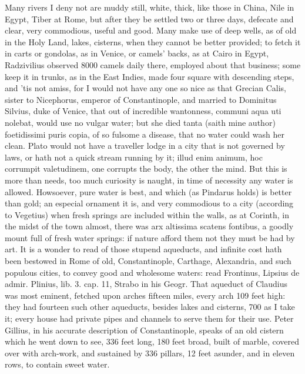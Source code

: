 {Many rivers I deny not are muddy still, white, thick, like those in
China, Nile in Egypt, Tiber at Rome, but after they be settled two or
three days, defecate and clear, very commodious, useful and good. Many
make use of deep wells, as of old in the Holy Land, lakes, cisterns,
when they cannot be better provided; to fetch it in carts or gondolas,
as in Venice, or camels' backs, as at Cairo in Egypt, Radzivilius
observed 8000 camels daily there, employed about that business; some
keep it in trunks, as in the East Indies, made four square with
descending steps, and 'tis not amiss, for I would not have any one so
nice as that Grecian Calis, sister to Nicephorus, emperor of
Constantinople, and married to Dominitus Silvius, duke of Venice,
that out of incredible wantonness, communi aqua uti nolebat, would use
no vulgar water; but she died tanta (saith mine author) foetidissimi
puris copia, of so fulsome a disease, that no water could wash her
clean. Plato would not have a traveller lodge in a city that is
not governed by laws, or hath not a quick stream running by it; illud
enim animum, hoc corrumpit valetudinem, one corrupts the body, the
other the mind. But this is more than needs, too much curiosity is
naught, in time of necessity any water is allowed. Howsoever, pure
water is best, and which (as Pindarus holds) is better than gold; an
especial ornament it is, and very commodious to a city (according to
Vegetius) when fresh springs are included within the walls, as at
Corinth, in the midst of the town almost, there was arx altissima
scatens fontibus, a goodly mount full of fresh water springs: if nature
afford them not they must be had by art. It is a wonder to read of
those stupend aqueducts, and infinite cost hath been bestowed in
Rome of old, Constantinople, Carthage, Alexandria, and such populous
cities, to convey good and wholesome waters: read Frontinus,
Lipsius de admir. Plinius, lib. 3. cap. 11, Strabo in his Geogr.
That aqueduct of Claudius was most eminent, fetched upon arches fifteen
miles, every arch 109 feet high: they had fourteen such other
aqueducts, besides lakes and cisterns, 700 as I take it; every
house had private pipes and channels to serve them for their use. Peter
Gillius, in his accurate description of Constantinople, speaks of an
old cistern which he went down to see, 336 feet long, 180 feet broad,
built of marble, covered over with arch-work, and sustained by 336
pillars, 12 feet asunder, and in eleven rows, to contain sweet water.
}
